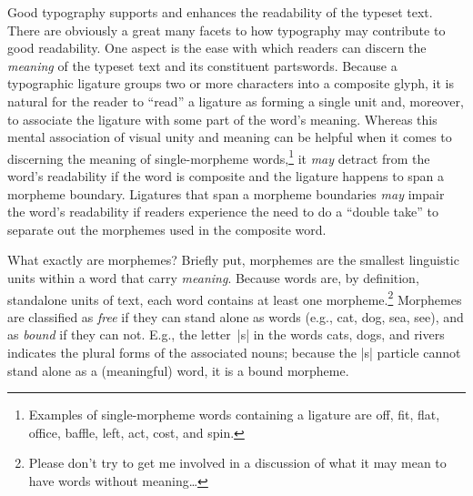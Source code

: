 \documentclass[11pt]{article}
\begin{document}
Good typography supports and enhances the readability of the typeset text. There are obviously a great many facets to how typography may contribute to good readability. One aspect is the ease with which readers can discern the \emph{meaning} of the typeset text and its constituent parts\textemdash words. Because a typographic ligature groups two or more characters into a composite glyph, it is natural for the reader to \enquote{read} a ligature as forming a single unit and, moreover, to associate the ligature with some part of the word's meaning. Whereas this mental association of visual unity and meaning can be helpful when it comes to discerning the meaning of single-morpheme words,\footnote{Examples of single-morpheme words containing a ligature are off, fit, flat, office, baffle, left, act, cost, and spin.} it \emph{may} detract from the word's readability if the word is composite and the ligature happens to span a morpheme boundary. Ligatures that span a morpheme boundaries \emph{may} impair the word's readability if readers experience the need to do a \enquote{double take} to separate out the morphemes used in the composite word.

What exactly are morphemes? Briefly put, morphemes are the smallest linguistic units within a word that carry \emph{meaning}. Because words are, by definition, standalone units of text, each word contains at least one morpheme.\footnote{Please don't try to get me involved in a discussion of what it may mean to have words without meaning\dots} Morphemes are classified as \emph{free} if they can stand alone as words (e.g., cat, dog, sea, see), and as \emph{bound} if they can not. E.g., the letter~|s| in the words cats, dogs, and rivers indicates the plural forms of the associated nouns; because the |s| particle cannot stand alone as a (meaningful) word, it is a bound morpheme. 

\enlargethispage{0.5\baselineskip}
\end{document}
